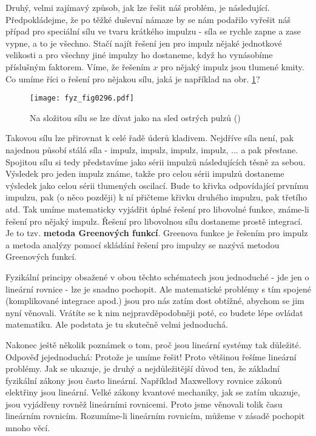    Druhý, velmi zajímavý způsob, jak lze řešit náš problém, je následující. Předpokládejme, že po 
    těžké duševní námaze by se nám podařilo vyřešit náš případ pro speciální sílu ve tvaru krátkého 
    impulzu - síla se rychle zapne a zase vypne, a to je všechno. Stačí najít řešení jen pro impulz 
    nějaké jednotkové velikosti a pro všechny jiné impulzy ho dostaneme, když ho vynásobíme 
    příslušným faktorem. Víme, že řešením \(x\) pro nějaký impulz jsou tlumené kmity. Co umíme říci 
    o řešení pro nějakou sílu, jaká je například na obr. \ref{fyz:fig0296}?

    \begin{figure}[ht!] %
      \centering
      \texttt{[image: fyz\_fig0296.pdf]}
      \caption{Na složitou sílu se lze dívat jako na sled ostrých pulzů
               (\cite[s.~337]{Feynman01})}
      \label{fyz:fig0296}
    \end{figure}
    
    Takovou sílu lze přirovnat k celé řadě úderů kladivem. Nejdříve síla není, pak najednou působí 
    stálá síla - impulz, impulz, impulz, impulz, ... a pak přestane. Spojitou sílu si tedy 
    představíme jako sérii impulzů následujících těsně za sebou. Výsledek pro jeden impulz známe, 
    takže pro celou sérii impulzů dostaneme výsledek jako celou sérii tlumených oscilací. Bude to 
    křivka odpovídající prvnímu impulzu, pak (o něco později) k ní přičteme křivku druhého impulzu, 
    pak třetího atd. Tak umíme matematicky vyjádřit úplné řešení pro libovolné funkce, známe-li 
    řešení pro nějaký impulz. Řešení pro libovolnou sílu dostaneme prostě integrací. Je to tzv. 
    \textbf{metoda Greenových funkcí}. Greenova funkce je řešením pro impulz a metoda analýzy 
    pomocí skládání řešení pro impulzy se nazývá metodou Greenových funkcí.
    
    Fyzikální principy obsažené v obou těchto schématech jsou jednoduché - jde jen o lineární 
    rovnice - lze je snadno pochopit. Ale matematické problémy s tím spojené (komplikované 
    integrace apod.) jsou pro nás zatím dost obtížné, abychom se jim nyní věnovali. Vrátíte se k 
    nim nejpravděpodobněji poté, co budete lépe ovládat matematiku. Ale podstata je tu skutečně 
    velmi jednoduchá.
    
    Nakonec ještě několik poznámek o tom, proč jsou lineární systémy tak důležité. Odpověď 
    jejednoduchá: Protože je umíme řešit! Proto většinou řešíme lineární problémy. Jak se ukazuje, 
    je druhý a nejdůležitější důvod ten, že základní fyzikální zákony jsou často lineární. 
    Například Maxwellovy rovnice zákonů elektřiny jsou lineární. Velké zákony kvantové mechaniky, 
    jak se zatím ukazuje, jsou vyjádřeny rovněž lineárními rovnicemi. Proto jsme věnovali tolik 
    času lineárním rovnicím. Rozumíme-li lineárním rovnicím, můžeme v zásadě pochopit mnoho věcí.
    

